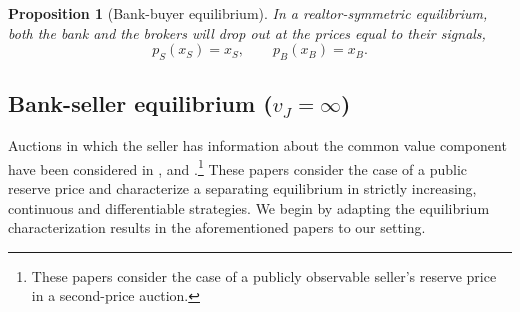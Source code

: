 \documentclass[11pt,twopage]{article}
\newtheorem{proposition}{Proposition}
{\bf}{\it}
\begin{document}
\begin{proposition}[Bank-buyer equilibrium] 
  In a realtor-symmetric equilibrium, both the bank and the brokers
  will drop out at the prices equal to their signals, \[ p_S(x_S) =
  x_S, \quad \quad p_B(x_B) = x_B. \]
\end{proposition}

\subsection{Bank-seller equilibrium ($v_J = \infty$)}

\label{sec:comm-value-comp}




%
%
% 
%
Auctions in which the seller has information about the common value
component have been considered in \cite{jullien2006auction},
\cite{cai2007reserve} and \cite{lamy}.\footnote{These papers consider
  the case of a publicly observable seller's reserve price in a
  second-price auction.}  These papers consider the case of a public
reserve price and characterize a separating equilibrium in strictly
increasing, continuous and differentiable strategies.
We begin by adapting the equilibrium characterization results in the
aforementioned papers to our setting.
\end{document}
